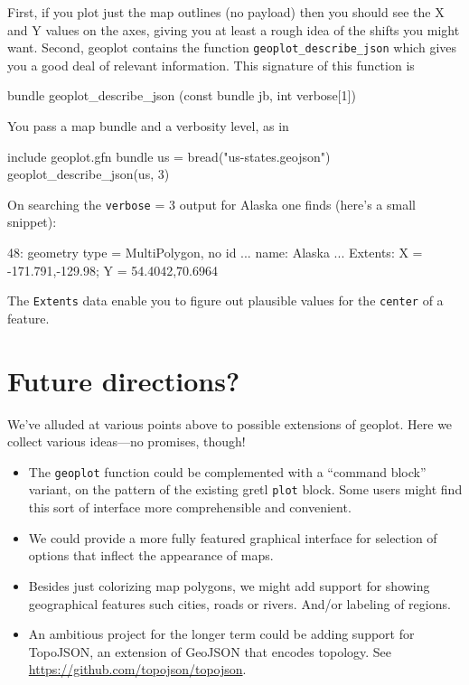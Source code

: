 \documentclass{article}
\begin{document}
First, if you plot just the map outlines (no payload) then you should
see the X and Y values on the axes, giving you at least a rough idea
of the shifts you might want. Second, \textsf{geoplot} contains the
function \texttt{geoplot\_describe\_json} which gives you a good deal
of relevant information. This signature of this function is
\begin{code}
bundle geoplot_describe_json (const bundle jb, int verbose[1])
\end{code}
You pass a map bundle and a verbosity level, as in
\begin{code}
include geoplot.gfn
bundle us = bread("us-states.geojson")
geoplot_describe_json(us, 3)
\end{code}
On searching the \texttt{verbose} = 3 output for Alaska one finds
(here's a small snippet):
\begin{code}
  48: geometry type = MultiPolygon, no id
        ...
        name: Alaska
        ...
        Extents: X = {-171.791,-129.98}; Y = {54.4042,70.6964}
\end{code}
The \texttt{Extents} data enable you to figure out plausible
values for the \texttt{center} of a feature.

\section{Future directions?}
\label{sec:future}

We've alluded at various points above to possible extensions of
\textsf{geoplot}. Here we collect various ideas---no promises, though!

\begin{itemize}
\item The \texttt{geoplot} function could be complemented with a
  ``command block'' variant, on the pattern of the existing gretl
  \texttt{plot} block. Some users might find this sort of interface
  more comprehensible and convenient.
\item We could provide a more fully featured graphical interface for
  selection of options that inflect the appearance of maps.
\item Besides just colorizing map polygons, we might add support
  for showing geographical features such cities, roads or rivers.
  And/or labeling of regions.
\item An ambitious project for the longer term could be adding support
  for TopoJSON, an extension of GeoJSON that encodes topology. See
  \url{https://github.com/topojson/topojson}.
\end{itemize}
\end{document}
